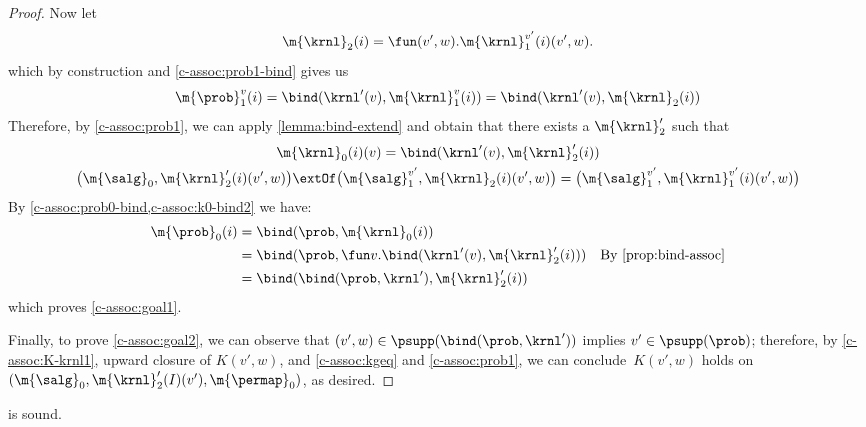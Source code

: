 \documentclass[acmsmall,nonacm,screen,appendix]{acmart}
\begin{document}
\begin{proof}
  Now let
  \[
    \m{\krnl}_2(i) = \fun (v', w). \m{\krnl}_1^{v'}(i)(v', w).
  \]
  which by construction and \cref{c-assoc:prob1-bind} gives us
  \[
    \m{\prob}_1^v(i)
    = \bind(\krnl'(v), \m{\krnl}_1^v(i))
    = \bind(\krnl'(v), \m{\krnl}_2(i))
  \]
  Therefore, by \cref{c-assoc:prob1}, we can apply \cref{lemma:bind-extend}
  and obtain that there exists a $\m{\krnl}_2'$ such that
  \begin{gather}
    \m{\krnl}_0(i)(v) = \bind(\krnl'(v), \m{\krnl}_2'(i))
    \label{c-assoc:k0-bind2}
    \\
    \bigl(\m{\salg}_0, \m{\krnl}_2'(i)(v',w)\bigr)
    \extOf
    \bigl(\m{\salg}_1^{v'}, \m{\krnl}_2(i)(v',w)\bigr)
    =
    \bigl(\m{\salg}_1^{v'},\m{\krnl}_1^{v'}(i)(v',w)\bigr)
    \label{c-assoc:kgeq}
  \end{gather}
  By \cref{c-assoc:prob0-bind,c-assoc:k0-bind2}
  we have:
  \begin{align*}
    \m{\prob}_0(i)
    &= \bind(\prob, \m{\krnl}_0(i)) \\
    &= \bind(\prob, \fun v.\bind(\krnl'(v), \m{\krnl}_2'(i)))
      &\text{By \eqref{prop:bind-assoc}}\\
    &= \bind(\bind(\prob, \krnl'), \m{\krnl}_2'(i))
  \end{align*}
  which proves \cref{c-assoc:goal1}.

  Finally, to prove \cref{c-assoc:goal2}, we can observe that
  $(v',w) \in \psupp(\bind(\prob,\krnl'))$ implies $v'\in \psupp(\prob)$;
  therefore, by \eqref{c-assoc:K-krnl1}, upward closure of $K(v',w)$, and
  \eqref{c-assoc:kgeq} and \eqref{c-assoc:prob1},
  we can conclude~$K(v',w)$ holds on
  $(\m{\salg}_0 , \m{\krnl}_2'(I) (v'), \m{\permap}_0)$,
  as desired.
\end{proof} \begin{lemma}
\label{proof:c-unassoc}
   is sound.
\end{lemma}
\end{document}
